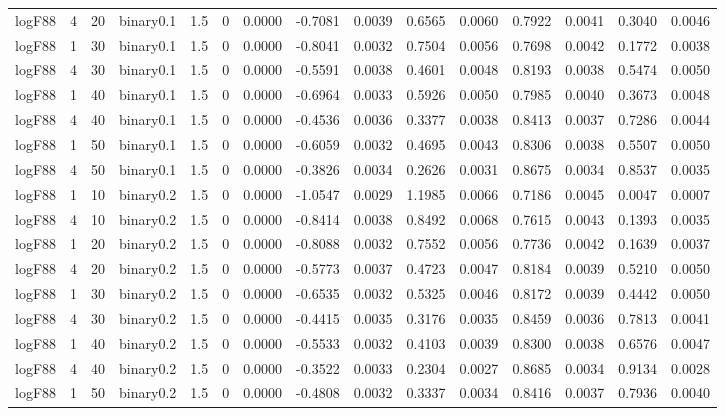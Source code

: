 \begin{longtable}{rrrrrrrrrrrrrrr}
  logF88 & 4 & 20 & binary0.1 & 1.5 & 0 & 0.0000 & -0.7081 & 0.0039 & 0.6565 & 0.0060 & 0.7922 & 0.0041 & 0.3040 & 0.0046 \\ 
  logF88 & 1 & 30 & binary0.1 & 1.5 & 0 & 0.0000 & -0.8041 & 0.0032 & 0.7504 & 0.0056 & 0.7698 & 0.0042 & 0.1772 & 0.0038 \\ 
  logF88 & 4 & 30 & binary0.1 & 1.5 & 0 & 0.0000 & -0.5591 & 0.0038 & 0.4601 & 0.0048 & 0.8193 & 0.0038 & 0.5474 & 0.0050 \\ 
  logF88 & 1 & 40 & binary0.1 & 1.5 & 0 & 0.0000 & -0.6964 & 0.0033 & 0.5926 & 0.0050 & 0.7985 & 0.0040 & 0.3673 & 0.0048 \\ 
  logF88 & 4 & 40 & binary0.1 & 1.5 & 0 & 0.0000 & -0.4536 & 0.0036 & 0.3377 & 0.0038 & 0.8413 & 0.0037 & 0.7286 & 0.0044 \\ 
  logF88 & 1 & 50 & binary0.1 & 1.5 & 0 & 0.0000 & -0.6059 & 0.0032 & 0.4695 & 0.0043 & 0.8306 & 0.0038 & 0.5507 & 0.0050 \\ 
  logF88 & 4 & 50 & binary0.1 & 1.5 & 0 & 0.0000 & -0.3826 & 0.0034 & 0.2626 & 0.0031 & 0.8675 & 0.0034 & 0.8537 & 0.0035 \\ 
  logF88 & 1 & 10 & binary0.2 & 1.5 & 0 & 0.0000 & -1.0547 & 0.0029 & 1.1985 & 0.0066 & 0.7186 & 0.0045 & 0.0047 & 0.0007 \\ 
  logF88 & 4 & 10 & binary0.2 & 1.5 & 0 & 0.0000 & -0.8414 & 0.0038 & 0.8492 & 0.0068 & 0.7615 & 0.0043 & 0.1393 & 0.0035 \\ 
  logF88 & 1 & 20 & binary0.2 & 1.5 & 0 & 0.0000 & -0.8088 & 0.0032 & 0.7552 & 0.0056 & 0.7736 & 0.0042 & 0.1639 & 0.0037 \\ 
  logF88 & 4 & 20 & binary0.2 & 1.5 & 0 & 0.0000 & -0.5773 & 0.0037 & 0.4723 & 0.0047 & 0.8184 & 0.0039 & 0.5210 & 0.0050 \\ 
  logF88 & 1 & 30 & binary0.2 & 1.5 & 0 & 0.0000 & -0.6535 & 0.0032 & 0.5325 & 0.0046 & 0.8172 & 0.0039 & 0.4442 & 0.0050 \\ 
  logF88 & 4 & 30 & binary0.2 & 1.5 & 0 & 0.0000 & -0.4415 & 0.0035 & 0.3176 & 0.0035 & 0.8459 & 0.0036 & 0.7813 & 0.0041 \\ 
  logF88 & 1 & 40 & binary0.2 & 1.5 & 0 & 0.0000 & -0.5533 & 0.0032 & 0.4103 & 0.0039 & 0.8300 & 0.0038 & 0.6576 & 0.0047 \\ 
  logF88 & 4 & 40 & binary0.2 & 1.5 & 0 & 0.0000 & -0.3522 & 0.0033 & 0.2304 & 0.0027 & 0.8685 & 0.0034 & 0.9134 & 0.0028 \\ 
  logF88 & 1 & 50 & binary0.2 & 1.5 & 0 & 0.0000 & -0.4808 & 0.0032 & 0.3337 & 0.0034 & 0.8416 & 0.0037 & 0.7936 & 0.0040 \\ 

\end{longtable}
